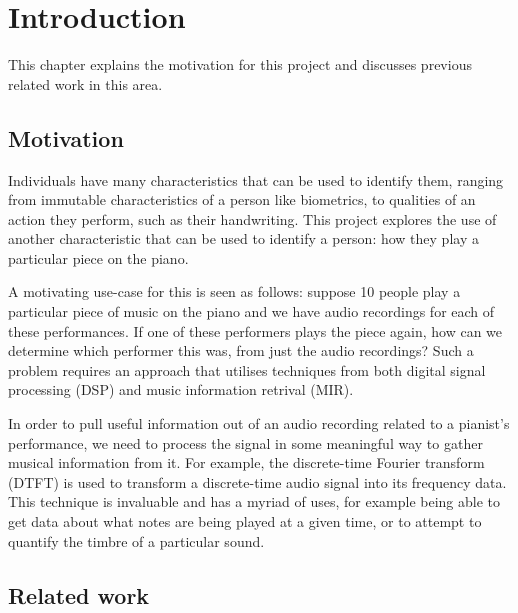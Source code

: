 \documentclass[oneside, class=book, crop=false, 12pt]{standalone}
\begin{document}
\ifstandalone
  \setcounter{chapter}{0}
  \chapter{Introduction}
\fi
{}

This chapter explains the motivation for this project and discusses previous related work in this area.

\section{Motivation}

Individuals have many characteristics that can be used to identify them, ranging from immutable characteristics of a person like biometrics, to qualities of an action they perform, such as their handwriting. This project explores the use of another characteristic that can be used to identify a person: how they play a particular piece on the piano. 

A motivating use-case for this is seen as follows: suppose 10 people play a particular piece of music on the piano and we have audio recordings for each of these performances. If one of these performers plays the piece again, how can we determine which performer this was, from just the audio recordings? Such a problem requires an approach that utilises techniques from both digital signal processing (DSP) and music information retrival (MIR).

In order to pull useful information out of an audio recording related to a pianist's performance, we need to process the signal in some meaningful way to gather musical information from it. For example, the discrete-time Fourier transform (DTFT) is used to transform a discrete-time audio signal into its frequency data. This technique is invaluable and has a myriad of uses, for example being able to get data about what notes are being played at a given time, or to attempt to quantify the timbre of a particular sound.


\section{Related work}


\ifstandalone
  \printbibliography
\fi
    
\end{document}
